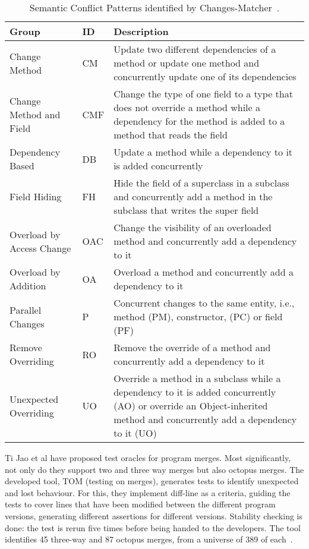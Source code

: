 \begin{table}[t]
\setlength\extrarowheight{2pt}
\begin{tabularx}{\textwidth}{llX}
 \toprule
 \textbf{Group} & \textbf{ID} & \textbf{Description} \\
 \midrule
 Change Method  & CM & Update two different dependencies of a method or update one method and concurrently update one of its
dependencies \\ 
 \hline
 Change Method
and Field & CMF & Change the type of one field to a type that does not
override a method while a dependency for the method
is added to a method that reads the field
 \\
 \hline
 Dependency
Based & DB & Update a method while a dependency to it is added
concurrently \\
 \hline
 Field Hiding & FH & Hide the field of a superclass in a subclass and concurrently add a method in the subclass that writes the
super field
 \\
 \hline
 Overload by Access Change & OAC & Change the visibility of an overloaded method and
concurrently add a dependency to it \\ 
 \hline
 Overload by Addition & OA & Overload a method and concurrently add a dependency to it \\  
 \hline
 Parallel Changes & P & Concurrent changes to the same entity, i.e., method
(PM), constructor, (PC) or field (PF) \\ 
 \hline
 Remove Overriding & RO & Remove the override of a method and concurrently
add a dependency to it \\  
  \hline
 Unexpected Overriding & UO & Override a method in a subclass while a dependency to it is added concurrently (AO) or override an
Object-inherited method and concurrently add a dependency to it (UO) \\
 \bottomrule
\end{tabularx}
\caption{\label{table:pattern-table}Semantic Conflict Patterns identified by Changes-Matcher~\cite{kn:nuno}.}
\end{table}


Ti Jao et al have proposed test oracles for program merges. Most significantly, not only do they support two and three way merges but also octopus merges. The developed tool, TOM (testing on merges), generates tests to identify unexpected and lost behaviour. For this, they implement diff-line as a criteria, guiding the tests to cover lines that have been modified between the different program versions, generating different assertions for different versions. Stability checking is done: the test is rerun five times before being handed to the developers. The tool identifies 45 three-way and 87 octopus merges, from a universe of 389 of each~\cite{kn:ji2022}.

